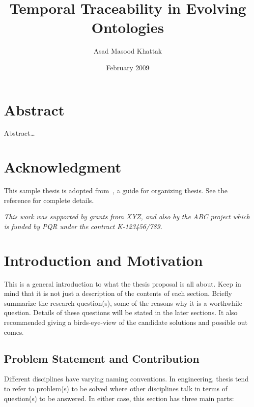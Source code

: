 \documentclass[12pt,a4paper,oneside]{book} %
\title{Temporal Traceability in Evolving Ontologies}
\author{Asad Masood Khattak}
\date{February 2009}
\begin{document}
\maketitle


\chapter*{Abstract}
Abstract\ldots

\certificateoforiginality

\chapter*{Acknowledgment}
This sample thesis is adopted from~\cite{Chinneck99}, a guide for organizing
thesis. See the reference for complete details.

\begin{center}
\emph{This work was supported by grants from XYZ, and also by the 
ABC project which is funded by PQR under the contract K-123456/789.}
\end{center}


\tableofcontents
\listoffigures
\listoftables

\resetpagenumbering



\chapter{Introduction and Motivation}
\label{c-intro}

This is a general introduction to what the thesis proposal is all about. Keep
in mind that it is not just a description of the contents of each section.
Briefly summarize the research question(s), some of the reasons why it is a
worthwhile question. Details of these questions will be stated in the later
sections. It also recommended giving a birds-eye-view of the candidate
solutions and possible out comes.


\section{Problem Statement and Contribution}
Different disciplines have varying naming conventions. In engineering, thesis
tend to refer to problem(s) to be solved where other disciplines talk in terms of
question(s) to be answered. In either case, this section has three main parts:
\end{document}
